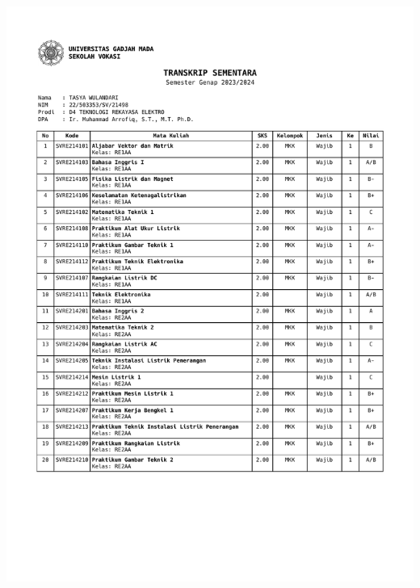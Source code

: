 \begin{itemize}
	\includegraphics[scale=0.7,page=2]{dokumen/transkrip_tasya.pdf}
	\newpage

\end{itemize}

